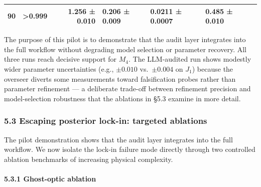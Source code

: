 \documentclass[
]{article}
\begin{document}
\begin{longtable}[]{@{}lrrllll@{}}
\begin{minipage}[t]{0.04\columnwidth}
90\strut
\end{minipage} & \begin{minipage}[t]{0.12\columnwidth}\raggedleft
\textgreater0.999\strut
\end{minipage} & \begin{minipage}[t]{0.11\columnwidth}\raggedright
1.256 ± 0.010\strut
\end{minipage} & \begin{minipage}[t]{0.11\columnwidth}\raggedright
0.206 ± 0.009\strut
\end{minipage} & \begin{minipage}[t]{0.13\columnwidth}\raggedright
0.0211 ± 0.0007\strut
\end{minipage} & \begin{minipage}[t]{0.11\columnwidth}\raggedright
0.485 ± 0.010\strut
\end{minipage}\tabularnewline
\bottomrule
\end{longtable}

The purpose of this pilot is to demonstrate that the audit layer
integrates into the full workflow without degrading model selection or
parameter recovery. All three runs reach decisive support for \(M_4\).
The LLM-audited run shows modestly wider parameter uncertainties (e.g.,
\(\pm 0.010\) vs.~\(\pm 0.004\) on \(J_1\)) because the overseer diverts
some measurements toward falsification probes rather than parameter
refinement --- a deliberate trade-off between refinement precision and
model-selection robustness that the ablations in §5.3 examine in more
detail.

\hypertarget{escaping-posterior-lock-in-targeted-ablations}{%
\subsubsection{5.3 Escaping posterior lock-in: targeted
ablations}\label{escaping-posterior-lock-in-targeted-ablations}}

The pilot demonstration shows that the audit layer integrates into the
full workflow. We now isolate the lock-in failure mode directly through
two controlled ablation benchmarks of increasing physical complexity.

\hypertarget{ghost-optic-ablation}{%
\paragraph{5.3.1 Ghost-optic ablation}\label{ghost-optic-ablation}}
\end{document}
